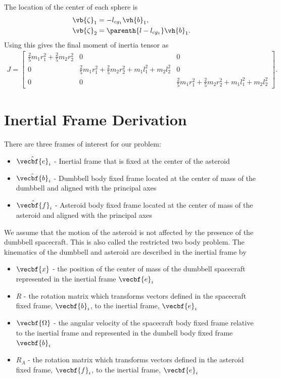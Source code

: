 \documentclass[11pt, reqno]{article}    %
\begin{document}
The location of the center of each sphere is 
\begin{align}
    \vb{\zeta}_1 &= -l_{cg_{1}} \vh{b}_1 , \\
    \vb{\zeta}_2 &= \parenth{l - l_{cg_{1}}} \vh{b}_1.
\end{align}
Using this gives the final moment of inertia tensor as
\begin{align}
    J = \begin{bmatrix}
        \frac{2}{5} m_1 r_1^2 + \frac{2}{5} m_2 r_2^2  & 0 & 0 \\
        0 & \frac{2}{5} m_1 r_1^2 + \frac{2}{5} m_2 r_2^2 + m_1 l_1^2 + m_2 l_2^2 & 0 \\
        0 & 0 & \frac{2}{5} m_1 r_1^2 + \frac{2}{5} m_2 r_2^2 + m_1 l_1^2 + m_2 l_2^2
    \end{bmatrix} .
\end{align}

\section{Inertial Frame Derivation}\label{sec:inertial_eoms}

There are three frames of interest for our problem:
\begin{itemize}
    \item \( \hat{\vecbf{e}}_i \) - Inertial frame that is fixed at the center of the asteroid
    \item \( \hat{\vecbf{b}}_i \) - Dumbbell body fixed frame located at the center of mass of the dumbbell and aligned with the principal axes
    \item \( \hat{\vecbf{f}}_i \) - Asteroid body fixed frame located at the center of mass of the asteroid and aligned with the principal axes
\end{itemize}
We assume that the motion of the asteroid is not affected by the presence of the dumbbell spacecraft.
This is also called the restricted two body problem.
The kinematics of the dumbbell and asteroid are described in the inertial frame by
\begin{itemize}
    \item \( \vecbf{x} \) - the position of the center of mass of the dumbbell spacecraft represented in the inertial frame \( \vecbf{e}_i\)
    \item \( R \) - the rotation matrix which transforms vectors defined in the spacecraft fixed frame, \( \vecbf{b}_i \), to the inertial frame, \( \vecbf{e}_i \)
    \item \( \vecbf{\Omega} \) - the angular velocity of the spacecraft body fixed frame relative to the inertial frame and represented in the dumbell body fixed frame \( \vecbf{b}_i \)
    \item \( R_A \) - the rotation matrix which transforms vectors defined in the asteroid fixed frame, \( \vecbf{f}_i \), to the inertial frame, \( \vecbf{e}_i \)
\end{itemize}
\end{document}
